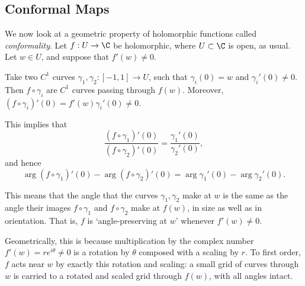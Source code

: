 \subsection{Conformal Maps}

We now look at a geometric property of holomorphic functions called \emph{conformality}.
Let $f: U \rightarrow \C$ be holomorphic, where $U \subset \C$ is open, as usual. Let $w \in U$, and suppose that $f'(w) \neq 0$.

Take two $C^1$ curves $\gamma_1, \gamma_2 : [-1, 1] \rightarrow U$, such that $\gamma_i(0) = w$ and $\gamma_i'(0) \neq 0$. Then $f \circ \gamma_i$ are $C^1$ curves passing through $f(w)$. 
Moreover, $(f \circ \gamma_i)'(0) = f'(w) \gamma_i'(0) \neq 0$.

This implies that
$$
\frac{(f \circ \gamma_1)'(0)}{(f \circ \gamma_2)'(0)} = \frac{\gamma_1'(0)}{\gamma_2'(0)},
$$
and hence
$$
\arg(f \circ \gamma_1)'(0) - \arg(f \circ \gamma_2)'(0) = \arg \gamma_1'(0) - \arg \gamma_2'(0).
$$

This means that the angle that the curves $\gamma_1, \gamma_2$ make at $w$ is the same as the angle their images $f \circ \gamma_1$ and $f\circ \gamma_2$ make at $f(w)$, in size as well as in orientation. That is, $f$ is `angle-preserving at $w$' whenever $f'(w) \neq 0$.

Geometrically, this is because multiplication by the complex number $f'(w) = re^{i\theta} \neq 0$ is a rotation by $\theta$ composed with a scaling by $r$. To first order, $f$ acts near $w$ by exactly this rotation and scaling: a small grid of curves through $w$ is carried to a rotated and scaled grid through $f(w)$, with all angles intact.

\begin{center}
\end{center}

